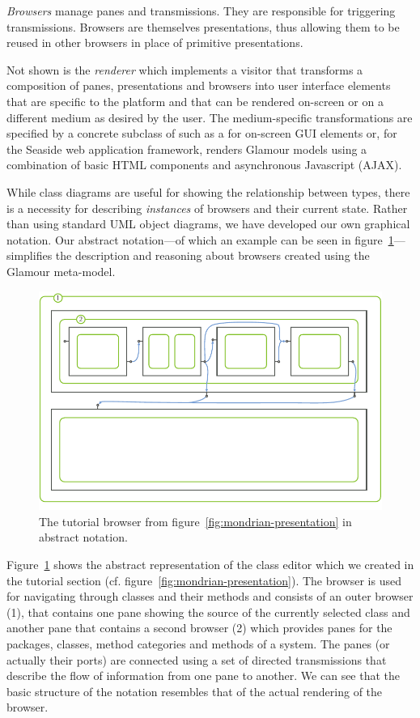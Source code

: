 \documentclass[a4paper,10pt,twoside]{book}
\begin{document}
\emph{Browsers} manage panes and transmissions. They are responsible for triggering transmissions. Browsers are themselves presentations, thus allowing them to be reused in other browsers in place of primitive presentations.

Not shown is the \emph{renderer} which implements a visitor that
transforms a composition of panes, presentations and browsers into
user interface elements that are specific to the platform and that can
be rendered on-screen or on a different medium as desired by the
user. The medium-specific transformations are specified by a concrete
subclass of  such as a  for
on-screen GUI elements or, for the Seaside web application framework,
 renders Glamour models using a combination of basic
HTML components and asynchronous Javascript (AJAX).

While class diagrams are useful for showing the relationship between
types, there is a necessity for describing \emph{instances} of
browsers and their current state. Rather than using standard UML
object diagrams, we have developed our own graphical notation. Our
abstract notation---of which an example can be seen in
figure~\ref{fig:schematic-browser}---simplifies the description and
reasoning about browsers created using the Glamour meta-model.

\begin{figure}[htbp]
\centerline{\includegraphics[width=\linewidth]{schematic_browser.pdf}}
\caption{The tutorial browser from figure~\ref{fig:mondrian-presentation} in abstract notation.}
\label{fig:schematic-browser}
\end{figure}

Figure~\ref{fig:schematic-browser} shows the abstract representation
of the class editor which we created in the tutorial section
(cf. figure~\ref{fig:mondrian-presentation}). The browser is used for
navigating through classes and their methods and consists of an outer
browser (1), that contains one pane showing the source of the
currently selected class and another pane that contains a second
browser (2) which provides panes for the packages, classes, method
categories and methods of a system. The panes (or actually their
ports) are connected using a set of directed transmissions that
describe the flow of information from one pane to another. We can see
that the basic structure of the notation resembles that of the actual
rendering of the browser.
\end{document}
